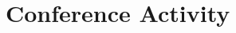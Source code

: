 \documentclass[11pt,letterpaper]{report}
\begin{document}
    \section*{Conference Activity}

%
%
%

%
%
%

%
%
%

%
%
%
\end{document}

